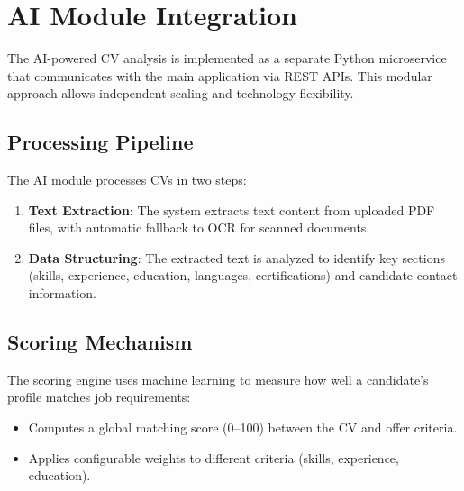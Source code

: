 \section{AI Module Integration}

The AI-powered CV analysis is implemented as a separate Python microservice that communicates with the main application via REST APIs. This modular approach allows independent scaling and technology flexibility.

\subsection{Processing Pipeline}

The AI module processes CVs in two steps:

\begin{enumerate}
    \item \textbf{Text Extraction}: The system extracts text content from uploaded PDF files, with automatic fallback to OCR for scanned documents.
    \item \textbf{Data Structuring}: The extracted text is analyzed to identify key sections (skills, experience, education, languages, certifications) and candidate contact information.
\end{enumerate}

\subsection{Scoring Mechanism}

The scoring engine uses machine learning to measure how well a candidate's profile matches job requirements:

\begin{itemize}
    \item Computes a global matching score (0--100) between the CV and offer criteria.
    \item Applies configurable weights to different criteria (skills, experience, education).
\end{itemize}

